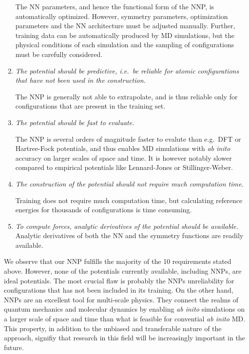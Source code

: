 \documentclass[twoside,english]{uiofysmaster}
\begin{document}
\begin{enumerate}
       The NN parameters, and hence the functional form of the NNP, is automatically optimized. However, 
       symmetry parameters, optimization parameters and the NN architecture must be adjusted manually. 
       Further, training data can be automatically produced by MD simulations, but the physical conditions 
       of each simulation and the sampling of configurations must be carefully considered. 
 \item \textit{The potential should be predictive, i.e.\ be reliable for atomic configurations that have not been used in the 
       construction.}
       
       The NNP is generally not able to extrapolate, and is thus reliable only for configurations that are present in 
       the training set. 
       
 \item \textit{The potential should be fast to evaluate.}
 
       The NNP is several orders of magnitude faster to evalute than e.g.\ DFT or Hartree-Fock potentials, 
       and thus enables MD simulations with \textit{ab inito} accuracy on larger scales of space and time.  
       It is however notably slower compared to empirical potentials like Lennard-Jones or Stillinger-Weber. 
 \item \textit{The construction of the potential should not require much computation time.}
 
       Training does not require much computation time, but calculating reference energies for thousands of configurations
       is time consuming. 
 \item \textit{To compute forces, analytic derivatives of the potential should be available.}
       Analytic derivatives of both the NN and the symmetry functions are readily available. 
\end{enumerate}
We observe that our NNP fulfills the majority of the 10 requirements stated above.  
However, none of the potentials currently available, including NNPs, are ideal potentials.
The most crucial flaw is probably the NNPs unreliability for configurations that has not been included in its training. 
On the other hand, NNPs are an excellent tool for multi-scale physics. They connect the realms of quantum mechanics 
and molecular dynamics by enabling \textit{ab inito} simulations on a larger scale of space and time than what is feasible 
for convential \textit{ab inito} MD. This property, in addition to the unbiased and transferable nature of the approach, 
signifiy that research in this field will be increasingly important in the future. 
\end{document}
